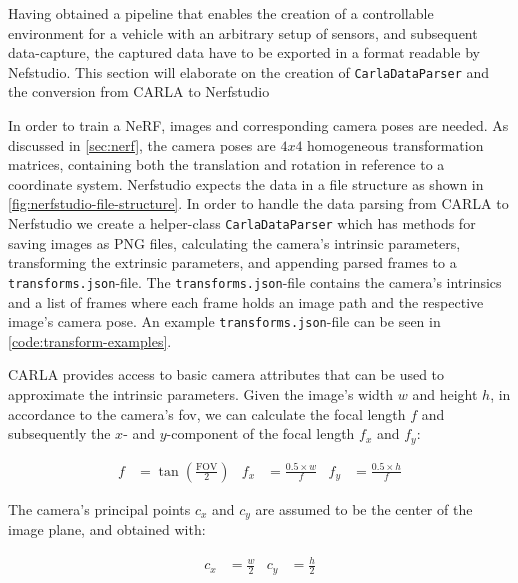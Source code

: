 Having obtained a pipeline that enables the creation of a controllable environment for a vehicle with an arbitrary setup of sensors, and subsequent data-capture, the captured data have to be exported in a format readable by Nefstudio. This section will elaborate on the creation of \texttt{CarlaDataParser} and the conversion from CARLA to Nerfstudio


In order to train a NeRF, images and corresponding camera poses are needed. As discussed in \autoref{sec:nerf}, the camera poses are $4x4$ homogeneous transformation matrices, containing both the translation and rotation in reference to a coordinate system. Nerfstudio expects the data in a file structure as shown in \autoref{fig:nerfstudio-file-structure}. In order to handle the data parsing from CARLA to Nerfstudio we create a helper-class \texttt{CarlaDataParser} which has methods for saving images as PNG files, calculating the camera's intrinsic parameters, transforming the extrinsic parameters, and appending parsed frames to a \texttt{transforms.json}-file. The \texttt{transforms.json}-file contains the camera's intrinsics and a list of frames where each frame holds an image path and the respective image's camera pose. An example \texttt{transforms.json}-file can be seen in \autoref{code:transform-examples}.




CARLA provides access to basic camera attributes that can be used to approximate the intrinsic parameters. Given the image's width $w$ and height $h$, in accordance to the camera's \acrfull{fov}, we can calculate the focal length $f$ and subsequently the $x$- and $y$-component of the focal length $f_x$ and $f_y$:

\begin{align*}
f &= \tan\left(\frac{\text{FOV}}{2}\right) &
f_x &= \frac{0.5 \times w}{f} &
f_y &= \frac{0.5 \times h}{f}
\end{align*}

The camera's principal points $c_x$ and $c_y$ are assumed to be the center of the image plane, and obtained with:

\begin{align*}
c_x &= \frac{w}{2} &
c_y &= \frac{h}{2}
\end{align*}

